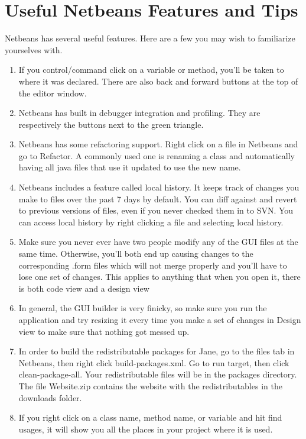 \documentclass{article}
\begin{document}
\section{Useful Netbeans Features and Tips}
Netbeans has several useful features. Here are a few you may wish to familiarize yourselves with.
\begin{enumerate}
\item If you control/command click on a variable or method, you'll be taken to where it was declared. There are also back and forward buttons at the top of the editor window.

\item Netbeans has built in debugger integration and profiling. They are respectively the buttons next to the green triangle.

\item Netbeans has some refactoring support. Right click on a file in Netbeans and go to Refactor. A commonly used one is renaming a class and automatically having all java files that use it updated to use the new name.

\item Netbeans includes a feature called local history. It keeps track of changes you make to files over the past 7 days by default. You can diff against and revert to previous versions of files, even if you never checked them in to SVN. You can access local history by right clicking a file and selecting local history.

\item Make sure you never ever have two people modify any of the GUI files at the same time. Otherwise, you'll both end up causing changes to the corresponding .form files which will not merge properly and you'll have to lose one set of changes. This applies to anything that when you open it, there is both code view and a design view

\item In general, the GUI builder is very finicky, so make sure you run the application and try resizing it every time you make a set of changes in Design view to make sure that nothing got messed up.

\item In order to build the redistributable packages for Jane, go to the files tab in Netbeans, then right click build-packages.xml. Go to run target, then click clean-package-all. Your redistributable files will be in the packages directory. The file Website.zip contains the website with the redistributables in the downloads folder.

\item If you right click on a class name, method name, or variable and hit find usages, it will show you all the places in your project where it is used.
\end{enumerate}
\end{document}
